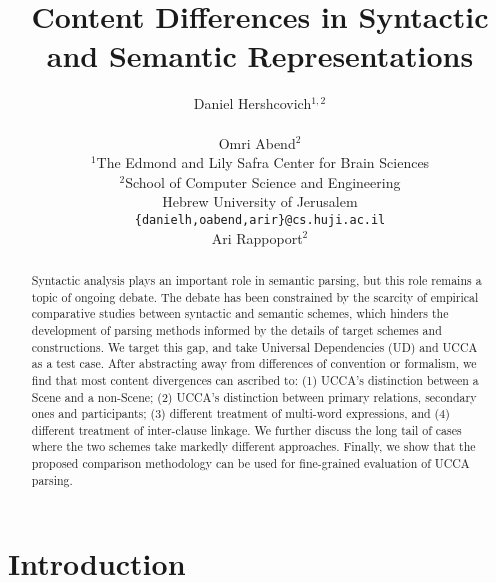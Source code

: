\documentclass[11pt,a4paper]{article}
\title{Content Differences in Syntactic and Semantic Representations}
\author{Daniel Hershcovich$^{1,2}$ \\
  \\\And
  Omri Abend$^2$ \\
  $^1$The Edmond and Lily Safra Center for Brain Sciences \\
  $^2$School of Computer Science and Engineering \\
  Hebrew University of Jerusalem \\
  \texttt{\{danielh,oabend,arir\}@cs.huji.ac.il}
  \\\And
  Ari Rappoport$^2$
}
\date{}
\begin{document}
\maketitle

\begin{abstract}

  Syntactic analysis plays an important role in semantic parsing,
  but this role remains a topic of ongoing debate.
  The debate has been constrained by the scarcity of empirical comparative studies between syntactic and semantic schemes,
  which hinders the development of parsing methods informed by the details of target schemes and constructions.
  We target this gap, and take Universal Dependencies (UD) and UCCA as a test case.
  After abstracting away from differences of convention or formalism,
  we find that most content divergences can ascribed to: 
  (1) UCCA's distinction between a Scene and a non-Scene; %
  (2) UCCA's distinction between primary relations, secondary ones and participants; %
  (3) different treatment of multi-word expressions, and
  (4) different treatment of inter-clause linkage.
  We further discuss the long tail of cases where the two schemes take markedly
  different approaches.
  Finally, we show that the proposed comparison methodology can be used
  for fine-grained evaluation of UCCA parsing.
\end{abstract}



\section{Introduction}\label{sec:introduction}
  
  \cite{abend2017state}
  
\end{document}

